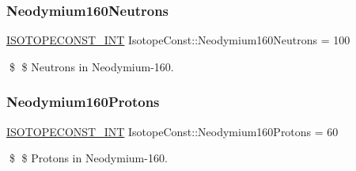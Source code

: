 \subsubsection{\texorpdfstring{Neodymium160\+Neutrons}{Neodymium160Neutrons}}
{\footnotesize\ttfamily \mbox{\hyperlink{group___isotope_const-_macros_ga5f18360b3e99483a35c32d789e62621c}{I\+S\+O\+T\+O\+P\+E\+C\+O\+N\+S\+T\+\_\+\+I\+NT}} Isotope\+Const\+::\+Neodymium160\+Neutrons = 100}

\$ \$ Neutrons in Neodymium-\/160. \mbox{\label{group___isotope_const-_neodymium-_nd160_ga68f7081078946e74a486992303ad69ca}} 
\subsubsection{\texorpdfstring{Neodymium160\+Protons}{Neodymium160Protons}}
{\footnotesize\ttfamily \mbox{\hyperlink{group___isotope_const-_macros_ga5f18360b3e99483a35c32d789e62621c}{I\+S\+O\+T\+O\+P\+E\+C\+O\+N\+S\+T\+\_\+\+I\+NT}} Isotope\+Const\+::\+Neodymium160\+Protons = 60}

\$ \$ Protons in Neodymium-\/160. 